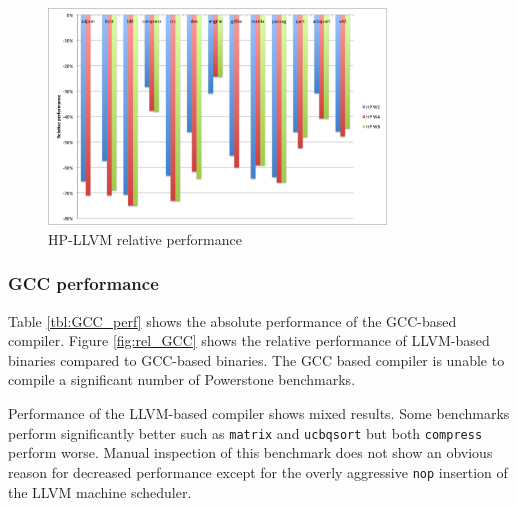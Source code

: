 \begin{figure}[h]
\centering
\includegraphics[width=0.8\textwidth]{5_results/img/rel_HP.png}
\caption{HP-LLVM relative performance}
\label{fig:rel_HP}
\end{figure}

\subsubsection{GCC performance}
Table \ref{tbl:GCC_perf} shows the absolute performance of the GCC-based compiler. Figure \ref{fig:rel_GCC} shows the relative performance of LLVM-based binaries compared to GCC-based binaries. The GCC based compiler is unable to compile a significant number of Powerstone benchmarks. 

Performance of the LLVM-based compiler shows mixed results. Some benchmarks perform significantly better such as \texttt{matrix} and \texttt{ucbqsort} but both \texttt{compress} perform worse. Manual inspection of this benchmark does not show an obvious reason for decreased performance except for the overly aggressive \texttt{nop} insertion of the LLVM machine scheduler.

